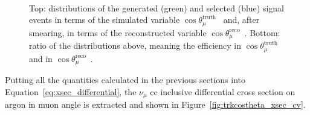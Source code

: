 \begin{figure}[t]
{   \label{fig:trkcostheta_efficiecy_reco}} \\
\caption[Simulated $\cos\theta_\mu$ Distributions and Efficiency in $\cos\theta_\mu$ Bins]{Top: distributions of the generated (green) and selected (blue) signal events in terms of the simulated variable $\cos\theta_\mu^\text{truth}$~\protect{} and, after smearing, in terms of the reconstructed variable $\cos\theta_\mu^\text{reco}$~\protect{}. Bottom: ratio of the distributions above, meaning the efficiency in $\cos\theta_\mu^\text{truth}$~\protect{} and in $\cos\theta_\mu^\text{reco}$~\protect{}.}
\label{fig:trkcostheta_eff_smear}
\end{figure}






Putting all the quantities calculated in the previous sections into Equation~\eqref{eq:xsec_differential}, the $\nu_\mu$ \acrshort{cc} inclusive differential cross section on argon in muon angle is extracted and shown in Figure~\ref{fig:trkcostheta_xsec_cv}. 

